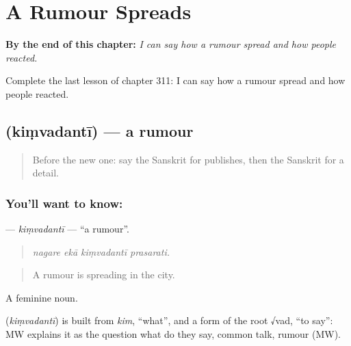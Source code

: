 
\chapter{A Rumour Spreads}
\label{ch:sa-a-rumour-spreads}

\begin{chapteropening}
\textbf{By the end of this chapter:} \emph{I can say how a rumour spread and how people reacted.}

Complete the last lesson of chapter 311: I can say how a rumour spread and how people reacted.
\end{chapteropening}

\section[\texorpdfstring{\sk{किंवदन्ती} (kiṃvadantī)}{किंवदन्ती (kiṃvadantī)}]{ (kiṃvadantī) — a rumour}

\label{lesson:SA-C311-kimvadanti}



\begin{quote}
Before the new one: say the Sanskrit for publishes, then the Sanskrit for a detail.
\end{quote}

\subsection*{You'll want to know: }
\textbf{} — \emph{kiṃvadantī} — \textquotedblleft{}a rumour\textquotedblright{}.

\begin{quote}
   
\end{quote}

\begin{quote}
\emph{nagare ekā kiṃvadantī prasarati.}
\end{quote}

\begin{quote}
A rumour is spreading in the city.
\end{quote}

A feminine noun.

\begin{cousinweb}
\textbf{} (\emph{kiṃvadantī}) is built from \emph{kim}, \textquotedblleft{}what\textquotedblright{}, and a form of the root √vad, \textquotedblleft{}to say\textquotedblright{}: MW explains it as the question what do they say, common talk, rumour (MW).
\end{cousinweb}

